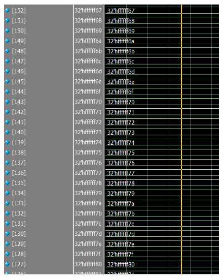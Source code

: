 \documentclass[conference]{IEEEtran}
\begin{document}
	\begin{figure}[H]
		\centering
		\includegraphics[width=\columnwidth]{Files/full_mem_val4}
		\caption{}
		\label{fig:fullmemval4}
	\end{figure}
	
\end{document}
